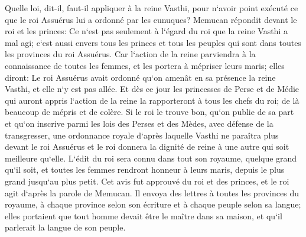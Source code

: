 \verse Quelle loi, dit-il, faut-il appliquer à la reine Vasthi, pour n`avoir point exécuté ce que le roi Assuérus lui a ordonné par les eunuques? 
\verse Memucan répondit devant le roi et les princes: Ce n`est pas seulement à l`égard du roi que la reine Vasthi a mal agi; c`est aussi envers tous les princes et tous les peuples qui sont dans toutes les provinces du roi Assuérus. 
\verse Car l`action de la reine parviendra à la connaissance de toutes les femmes, et les portera à mépriser leurs maris; elles diront: Le roi Assuérus avait ordonné qu`on amenât en sa présence la reine Vasthi, et elle n`y est pas allée. 
\verse Et dès ce jour les princesses de Perse et de Médie qui auront appris l`action de la reine la rapporteront à tous les chefs du roi; de là beaucoup de mépris et de colère. 
\verse Si le roi le trouve bon, qu`on publie de sa part et qu`on inscrive parmi les lois des Perses et des Mèdes, avec défense de la transgresser, une ordonnance royale d`après laquelle Vasthi ne paraîtra plus devant le roi Assuérus et le roi donnera la dignité de reine à une autre qui soit meilleure qu`elle. 
\verse L`édit du roi sera connu dans tout son royaume, quelque grand qu`il soit, et toutes les femmes rendront honneur à leurs maris, depuis le plus grand jusqu`au plus petit. 
\verse Cet avis fut approuvé du roi et des princes, et le roi agit d`après la parole de Memucan. 
\verse Il envoya des lettres à toutes les provinces du royaume, à chaque province selon son écriture et à chaque peuple selon sa langue; elles portaient que tout homme devait être le maître dans sa maison, et qu`il parlerait la langue de son peuple. 

\chapter{}

